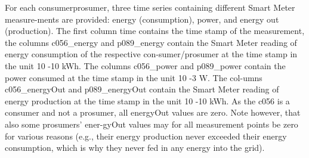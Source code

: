 For each consumer\/prosumer, three time series containing different Smart Meter measure-ments are provided: energy (consumption), power, and energy out (production). The first column time contains the time stamp of the measurement, the columns c056\_energy and p089\_energy contain the Smart Meter reading of energy consumption of the respective con-sumer/prosumer at the time stamp in the unit 10 -10 kWh. The columns c056\_power and p089\_power contain the power consumed at the time stamp in the unit 10 -3 W. The col-umns c056\_energyOut and p089\_energyOut contain the Smart Meter reading of energy production at the time stamp in the unit 10 -10 kWh. As the c056 is a consumer and not a prosumer, all energyOut values are zero. Note however, that also some prosumers’ ener-gyOut values may for all measurement points be zero for various reasons (e.g., their energy production never exceeded their energy consumption, which is why they never fed in any energy into the grid). 


\subsubsection{}




